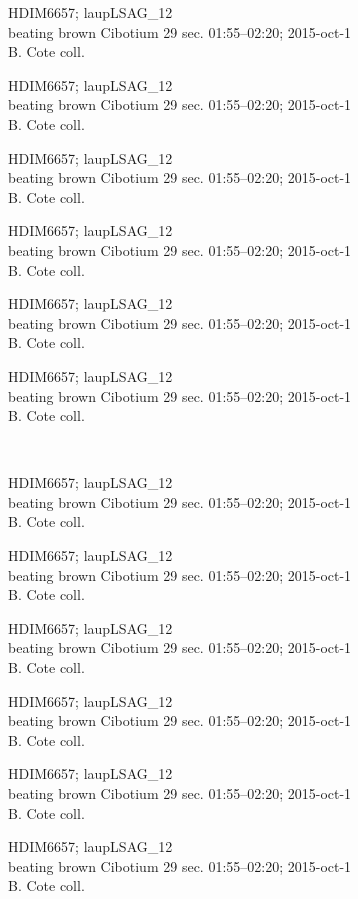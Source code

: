 \documentclass[2pt]{extarticle}
\begin{document}
\noindent
\parbox{0.16\textwidth}{\tiny \raggedright \rule[-0.3\baselineskip]{0pt}{10pt}HDIM6657; laupLSAG\_12\\ beating brown Cibotium 29 sec. 01:55--02:20; 2015-oct-1\\ B. Cote coll.}
\parbox{0.16\textwidth}{\tiny \raggedright \rule[-0.3\baselineskip]{0pt}{10pt}HDIM6657; laupLSAG\_12\\ beating brown Cibotium 29 sec. 01:55--02:20; 2015-oct-1\\ B. Cote coll.}
\parbox{0.16\textwidth}{\tiny \raggedright \rule[-0.3\baselineskip]{0pt}{10pt}HDIM6657; laupLSAG\_12\\ beating brown Cibotium 29 sec. 01:55--02:20; 2015-oct-1\\ B. Cote coll.}
\parbox{0.16\textwidth}{\tiny \raggedright \rule[-0.3\baselineskip]{0pt}{10pt}HDIM6657; laupLSAG\_12\\ beating brown Cibotium 29 sec. 01:55--02:20; 2015-oct-1\\ B. Cote coll.}
\parbox{0.16\textwidth}{\tiny \raggedright \rule[-0.3\baselineskip]{0pt}{10pt}HDIM6657; laupLSAG\_12\\ beating brown Cibotium 29 sec. 01:55--02:20; 2015-oct-1\\ B. Cote coll.}
\parbox{0.16\textwidth}{\tiny \raggedright \rule[-0.3\baselineskip]{0pt}{10pt}HDIM6657; laupLSAG\_12\\ beating brown Cibotium 29 sec. 01:55--02:20; 2015-oct-1\\ B. Cote coll.} \\ 
\vspace{0.001in} 

\noindent
\parbox{0.16\textwidth}{\tiny \raggedright \rule[-0.3\baselineskip]{0pt}{10pt}HDIM6657; laupLSAG\_12\\ beating brown Cibotium 29 sec. 01:55--02:20; 2015-oct-1\\ B. Cote coll.}
\parbox{0.16\textwidth}{\tiny \raggedright \rule[-0.3\baselineskip]{0pt}{10pt}HDIM6657; laupLSAG\_12\\ beating brown Cibotium 29 sec. 01:55--02:20; 2015-oct-1\\ B. Cote coll.}
\parbox{0.16\textwidth}{\tiny \raggedright \rule[-0.3\baselineskip]{0pt}{10pt}HDIM6657; laupLSAG\_12\\ beating brown Cibotium 29 sec. 01:55--02:20; 2015-oct-1\\ B. Cote coll.}
\parbox{0.16\textwidth}{\tiny \raggedright \rule[-0.3\baselineskip]{0pt}{10pt}HDIM6657; laupLSAG\_12\\ beating brown Cibotium 29 sec. 01:55--02:20; 2015-oct-1\\ B. Cote coll.}
\parbox{0.16\textwidth}{\tiny \raggedright \rule[-0.3\baselineskip]{0pt}{10pt}HDIM6657; laupLSAG\_12\\ beating brown Cibotium 29 sec. 01:55--02:20; 2015-oct-1\\ B. Cote coll.}
\parbox{0.16\textwidth}{\tiny \raggedright \rule[-0.3\baselineskip]{0pt}{10pt}HDIM6657; laupLSAG\_12\\ beating brown Cibotium 29 sec. 01:55--02:20; 2015-oct-1\\ B. Cote coll.} \\ 
\vspace{0.001in} 
\end{document}
